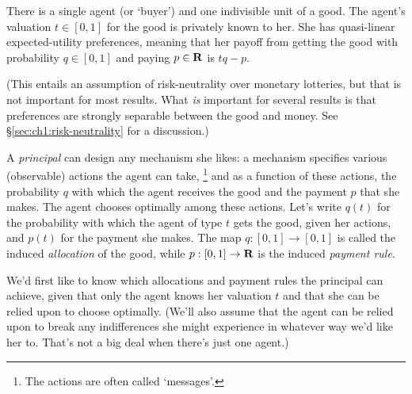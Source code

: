 






There is a single agent (or `buyer') and one indivisible unit of a good.
The agent's valuation $t \in [0,1]$ for the good is privately known to her.
She has quasi-linear expected-utility preferences, meaning that her payoff from getting the good with probability $q \in [0,1]$ and paying $p \in \mathbf{R}$ is $t q - p$.

(This entails an assumption of risk-neutrality over monetary lotteries, but that is not important for most results. What \emph{is} important for several results is that preferences are strongly separable between the good and money. See §\ref{sec:ch1:risk-neutrality} for a discussion.)

A \emph{principal} can design any mechanism she likes:
a mechanism specifies various (observable) actions the agent can take,%
	\footnote{The actions are often called `messages'.}
and as a function of these actions, the probability $q$ with which the agent receives the good and the payment $p$ that she makes.
The agent chooses optimally among these actions.
Let's write $q(t)$ for the probability with which the agent of type $t$ gets the good, given her actions, and $p(t)$ for the payment she makes.
The map $q : [0,1] \to [0,1]$ is called the induced \emph{allocation} of the good, while $p : [0,1] \to \mathbf{R}$ is the induced \emph{payment rule.}

We'd first like to know which allocations and payment rules the principal can achieve,
given that only the agent knows her valuation $t$ and that she can be relied upon to choose optimally.
(We'll also assume that the agent can be relied upon to break any indifferences she might experience in whatever way we'd like her to. That's not a big deal when there's just one agent.)



